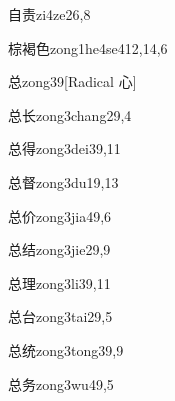 \begin{verbete}{自责}{zi4ze2}{6,8}
\end{verbete}

\begin{verbete}{棕褐色}{zong1he4se4}{12,14,6}
\end{verbete}

\begin{verbete}{总}{zong3}{9}[Radical 心]
\end{verbete}

\begin{verbete}{总长}{zong3chang2}{9,4}
\end{verbete}

\begin{verbete}{总得}{zong3dei3}{9,11}
\end{verbete}

\begin{verbete}{总督}{zong3du1}{9,13}
\end{verbete}

\begin{verbete}{总价}{zong3jia4}{9,6}
\end{verbete}

\begin{verbete}{总结}{zong3jie2}{9,9}
\end{verbete}

\begin{verbete}{总理}{zong3li3}{9,11}
\end{verbete}

\begin{verbete}{总台}{zong3tai2}{9,5}
\end{verbete}

\begin{verbete}{总统}{zong3tong3}{9,9}
\end{verbete}

\begin{verbete}{总务}{zong3wu4}{9,5}
\end{verbete}

